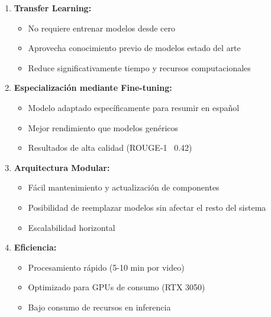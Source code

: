 \documentclass[12pt,a4paper]{article}
\begin{document}
\begin{enumerate}[leftmargin=*]
    \item \textbf{Transfer Learning:}
    \begin{itemize}
        \item No requiere entrenar modelos desde cero
        \item Aprovecha conocimiento previo de modelos estado del arte
        \item Reduce significativamente tiempo y recursos computacionales
    \end{itemize}
    
    \item \textbf{Especialización mediante Fine-tuning:}
    \begin{itemize}
        \item Modelo adaptado específicamente para resumir en español
        \item Mejor rendimiento que modelos genéricos
        \item Resultados de alta calidad (ROUGE-1 ~0.42)
    \end{itemize}
    
    \item \textbf{Arquitectura Modular:}
    \begin{itemize}
        \item Fácil mantenimiento y actualización de componentes
        \item Posibilidad de reemplazar modelos sin afectar el resto del sistema
        \item Escalabilidad horizontal
    \end{itemize}
    
    \item \textbf{Eficiencia:}
    \begin{itemize}
        \item Procesamiento rápido (5-10 min por video)
        \item Optimizado para GPUs de consumo (RTX 3050)
        \item Bajo consumo de recursos en inferencia
    \end{itemize}
\end{enumerate}

\newpage

\end{document}
